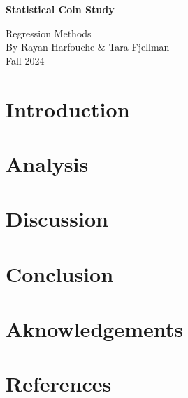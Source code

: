 \documentclass[a4paper, 12pt,oneside]{article}
\begin{document}
 
	\begin{center}
	    \Large
	    \textbf{Statistical Coin Study}
	        
	    \vspace{0.4cm}
	    \large
		Regression Methods \\
	    By Rayan Harfouche \& Tara Fjellman \\
	    \small{Fall 2024}
	\end{center}
	\section{Introduction}
	\section{Analysis}
	\section{Discussion}
	\section{Conclusion}
	\section*{Aknowledgements}
	\section*{References}
\end{document}
